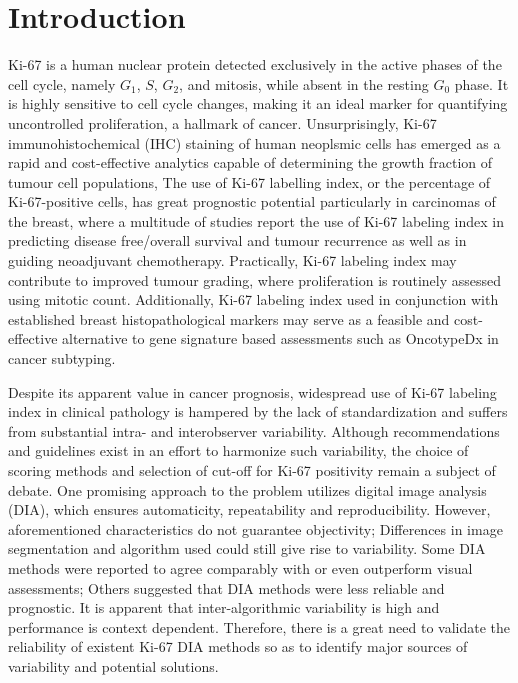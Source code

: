 \documentclass[final,5p,times,twocolumn]{elsarticle}
\begin{document}
\linenumbers

\section*{Introduction}

Ki-67 is a human nuclear protein detected exclusively in the active phases of the cell cycle, namely $G_1$, $S$, $G_2$, and mitosis, while absent in the resting $G_0$ phase.\cite{Gerdes1984} It is highly sensitive to cell cycle changes, making it an ideal marker for quantifying uncontrolled proliferation, a hallmark of cancer. Unsurprisingly, Ki-67 immunohistochemical (IHC) staining of human neoplsmic cells has emerged as a rapid and cost-effective analytics capable of determining the growth fraction of tumour cell populations,  \cite{Scholzen2000} The use of Ki-67 labelling index, or the percentage of Ki-67-positive cells, has great prognostic potential particularly in carcinomas of the breast, where a multitude of studies report the use of Ki-67 labeling index in predicting disease free/overall survival and tumour recurrence \cite{Stuart-Harris2005, DeAzambuja2007, Petrelli2015} as well as in guiding neoadjuvant chemotherapy. \cite{Jones2009, Nishimura2010, Fasching2011} Practically, Ki-67 labeling index may contribute to improved tumour grading, where proliferation is routinely assessed using mitotic count. \cite{VanDiest2004} Additionally, Ki-67 labeling index used in conjunction with established breast histopathological markers may serve as a feasible and cost-effective alternative to gene signature based assessments such as OncotypeDx in cancer subtyping. \cite{Cuzick2011}

Despite its apparent value in cancer prognosis, widespread use of Ki-67 labeling index in clinical pathology is hampered by the lack of standardization and suffers from substantial intra- and interobserver variability. \cite{Dowsett2011a, Polley2013a} Although recommendations and guidelines exist in an effort to harmonize such variability, \cite{Polley2015} the choice of scoring methods and selection of cut-off for Ki-67 positivity remain a subject of debate. One promising approach to the problem utilizes digital image analysis (DIA), which ensures automaticity, repeatability and reproducibility. However, aforementioned characteristics do not guarantee objectivity; Differences in image segmentation and algorithm used could still give rise to variability. \cite{Tadrous2010} Some DIA methods were reported to agree comparably with \cite{Mohammed2012, Tang2012} or even outperform visual assessments; \cite{Laurinavicius2014, Stalhammar2016} Others suggested that DIA methods were less reliable and prognostic. \cite{Chabot-Richards2011} It is apparent that inter-algorithmic variability is high and performance is context dependent. Therefore, there is a great need to validate the reliability of existent Ki-67 DIA methods so as to identify major sources of variability and potential solutions.
\end{document}

